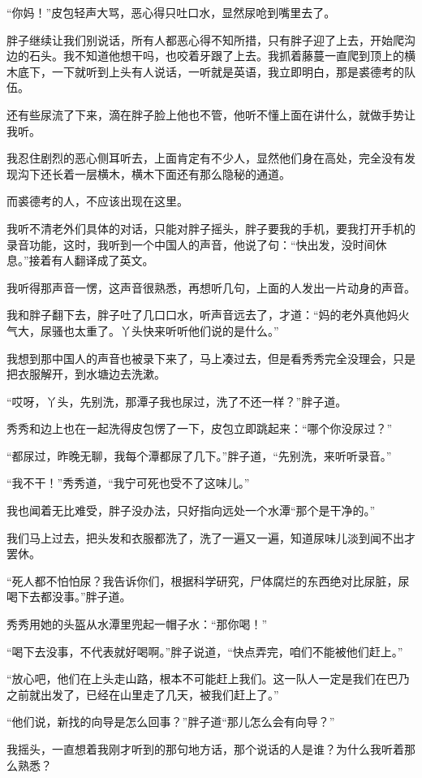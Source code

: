 “你妈！”皮包轻声大骂，恶心得只吐口水，显然尿呛到嘴里去了。

胖子继续让我们别说话，所有人都恶心得不知所措，只有胖子迎了上去，开始爬沟边的石头。我不知道他想干吗，也咬着牙跟了上去。我抓着藤蔓一直爬到顶上的横木底下，一下就听到上头有人说话，一听就是英语，我立即明白，那是裘德考的队伍。

还有些尿流了下来，滴在胖子脸上他也不管，他听不懂上面在讲什么，就做手势让我听。

我忍住剧烈的恶心侧耳听去，上面肯定有不少人，显然他们身在高处，完全没有发现沟下还长着一层横木，横木下面还有那么隐秘的通道。

而裘德考的人，不应该出现在这里。

我听不清老外们具体的对话，只能对胖子摇头，胖子要我的手机，要我打开手机的录音功能，这时，我听到一个中国人的声音，他说了句：“快出发，没时间休息。”接着有人翻译成了英文。

我听得那声音一愣，这声音很熟悉，再想听几句，上面的人发出一片动身的声音。

我和胖子翻下去，胖子吐了几口口水，听声音远去了，才道：“妈的老外真他妈火气大，尿骚也太重了。丫头快来听听他们说的是什么。”

我想到那中国人的声音也被录下来了，马上凑过去，但是看秀秀完全没理会，只是把衣服解开，到水塘边去洗漱。

“哎呀，丫头，先别洗，那潭子我也尿过，洗了不还一样？”胖子道。

秀秀和边上也在一起洗得皮包愣了一下，皮包立即跳起来：“哪个你没尿过？”

“都尿过，昨晚无聊，我每个潭都尿了几下。”胖子道，“先别洗，来听听录音。”

“我不干！”秀秀道，“我宁可死也受不了这味儿。”

我也闻着无比难受，胖子没办法，只好指向远处一个水潭“那个是干净的。”

我们马上过去，把头发和衣服都洗了，洗了一遍又一遍，知道尿味儿淡到闻不出才罢休。

“死人都不怕怕尿？我告诉你们，根据科学研究，尸体腐烂的东西绝对比尿脏，尿喝下去都没事。”胖子道。

秀秀用她的头盔从水潭里兜起一帽子水：“那你喝！”

“喝下去没事，不代表就好喝啊。”胖子说道，“快点弄完，咱们不能被他们赶上。”

“放心吧，他们在上头走山路，根本不可能赶上我们。这一队人一定是我们在巴乃之前就出发了，已经在山里走了几天，被我们赶上了。”

“他们说，新找的向导是怎么回事？”胖子道“那儿怎么会有向导？”

我摇头，一直想着我刚才听到的那句地方话，那个说话的人是谁？为什么我听着那么熟悉？

